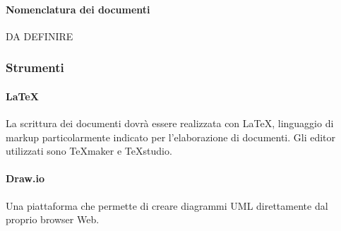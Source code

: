 \paragraph{Nomenclatura dei documenti}
DA DEFINIRE

\subsubsection{Strumenti}

\paragraph{\LaTeX}
La scrittura dei documenti dovrà essere realizzata con \LaTeX , linguaggio di markup particolarmente indicato per l'elaborazione di documenti.
Gli editor utilizzati sono \TeX maker e \TeX studio.

\paragraph{Draw.io}
Una piattaforma che permette di creare diagrammi UML direttamente dal proprio browser Web.


